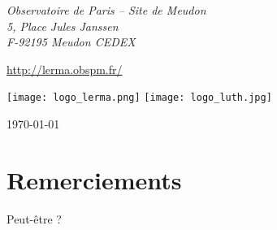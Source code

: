 \begin{center}
{\textit{Observatoire de Paris – Site de Meudon\\
5, Place Jules Janssen\\
F-92195 Meudon CEDEX}

\url{http://lerma.obspm.fr/}
} %

\vspace{0.5cm}

\texttt{[image: logo\_lerma.png]} \hfill \texttt{[image: logo\_luth.jpg]}

\end{center}

\vfill
\hfill \today

\newpage

\thispagestyle{empty}

\section*{Remerciements}

Peut-être ?

\tableofcontents

